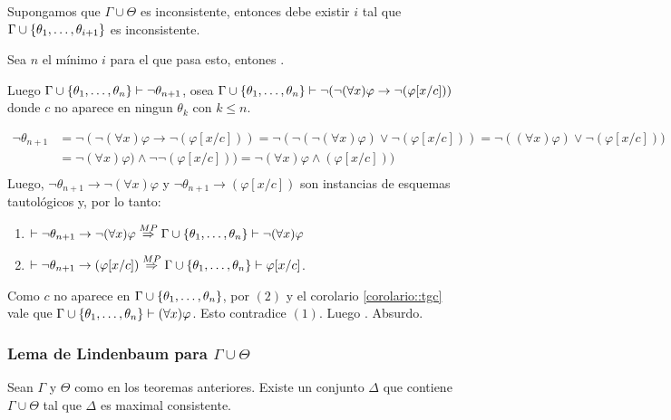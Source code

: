 \begin{demo}
	Supongamos que $\Gamma\cup\Theta$ es inconsistente, entonces debe existir $i$ tal que $\Gamma\cup\{\theta_1,\dots, \theta_{i+1}\}$ es inconsistente.
	
	Sea $n$ el mínimo $i$ para el que pasa esto, entones .
	
	Luego $\Gamma\cup\{\theta_1,\dots, \theta_{n}\}\vdash\lnot\theta_{n+1}$, osea  $\Gamma\cup\{\theta_1,\dots, \theta_{n}\}\vdash\lnot(\lnot(\forall x)\varphi\to\lnot(\varphi[x/c]))$ donde $c$ no aparece en ningun $\theta_k$ con $k \leq n$.
\end{demo}
\begin{demoPart}
	\begin{align*}
		\lnot\theta_{n+1} &= \lnot(\lnot(\forall x)\varphi\to\lnot(\varphi[x/c]))
		= \lnot(\lnot(\lnot(\forall x)\varphi)\lor\lnot(\varphi[x/c]))
		=  \lnot((\forall x)\varphi)\lor\lnot(\varphi[x/c])) \\
		& = \lnot(\forall x)\varphi)\land\lnot\lnot(\varphi[x/c])) = \lnot(\forall x)\varphi\land (\varphi[x/c]))\\
	\end{align*}
Luego, $\lnot\theta_{n+1}\to\lnot(\forall x)\varphi$ y $\lnot\theta_{n+1}\to(\varphi[x/c])$ son instancias de esquemas tautológicos y, por lo tanto:
\begin{enumerate}
	\item $\vdash\lnot\theta_{n+1}\to\lnot(\forall x)\varphi\overset{MP}{\Rightarrow} \Gamma\cup\{\theta_1,\dots, \theta_{n}\}\vdash\lnot(\forall x)\varphi$
	\item $\vdash\lnot\theta_{n+1}\to(\varphi[x/c])\overset{MP}{\Rightarrow} \Gamma\cup\{\theta_1,\dots, \theta_{n}\}\vdash\varphi[x/c]$. 
\end{enumerate} 
Como $c$ no aparece en $\Gamma\cup\{\theta_1,\dots, \theta_{n}\}$, por $(2)$ y el corolario \ref{corolario::tgc} vale que $\Gamma\cup\{\theta_1,\dots, \theta_{n}\}\vdash(\forall x)\varphi$. Esto contradice $(1)$. Luego . Absurdo.
\end{demoPart}

\subsubsection{Lema de Lindenbaum para $\Gamma\cup\Theta$}
\begin{teorema}
	Sean $\Gamma$ y $\Theta$ como en los teoremas anteriores. Existe un conjunto $\Delta$ que contiene $\Gamma\cup\Theta$ tal que $\Delta$ es maximal consistente.
\end{teorema}

